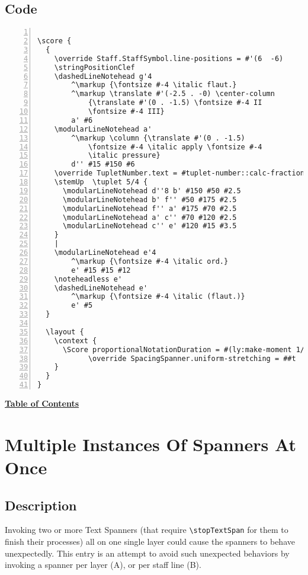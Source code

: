\subsection{Code}
\begin{Verbatim}[numbers=left,xleftmargin=5mm]

\score {
  {
    \override Staff.StaffSymbol.line-positions = #'(6  -6)
    \stringPositionClef 
    \dashedLineNotehead g'4
    	^\markup {\fontsize #-4 \italic flaut.}
    	^\markup \translate #'(-2.5 . -0) \center-column 
			{\translate #'(0 . -1.5) \fontsize #-4 II 
			\fontsize #-4 III} 
		a' #6
    \modularLineNotehead a'
    	^\markup \column {\translate #'(0 . -1.5) 
			\fontsize #-4 \italic apply \fontsize #-4 
			\italic pressure} 
		d'' #15 #150 #6
    \override TupletNumber.text = #tuplet-number::calc-fraction-text
    \stemUp  \tuplet 5/4 {
      \modularLineNotehead d''8 b' #150 #50 #2.5
      \modularLineNotehead b' f'' #50 #175 #2.5
      \modularLineNotehead f'' a' #175 #70 #2.5
      \modularLineNotehead a' c'' #70 #120 #2.5
      \modularLineNotehead c'' e' #120 #15 #3.5
    }
    |
    \modularLineNotehead e'4
    	^\markup {\fontsize #-4 \italic ord.} 
		e' #15 #15 #12
    \noteheadless e'
    \dashedLineNotehead e'
    	^\markup {\fontsize #-4 \italic (flaut.)} 
		e' #5
  }

  \layout {
    \context {
      \Score proportionalNotationDuration = #(ly:make-moment 1/10)    
      		\override SpacingSpanner.uniform-stretching = ##t
    }
  }
}

\end{Verbatim}

\hyperref[sec:toc]{\textbf{Table of Contents}}

\vfill \break


\section {Multiple Instances Of Spanners At Once}
\label{sec:comb_spanners}
\hfill
{}
\hfill

\subsection{Description}
Invoking two or more Text Spanners (that require \verb|\stopTextSpan| for them to finish their processes) all on one single layer could cause the spanners to behave unexpectedly. This entry is an attempt to avoid such unexpected behaviors by invoking a spanner per layer (A), or per staff line (B).

